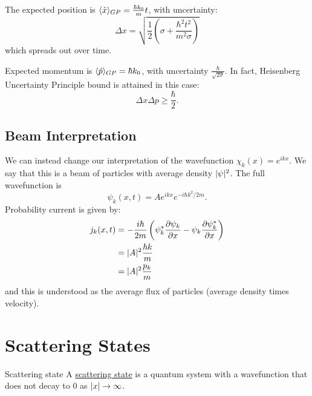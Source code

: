 \documentclass[../Main.tex]{subfiles}
\begin{document}
The expected position is $\langle \hat{x} \rangle_{GP} = \frac{\hbar k_0}{m}t$, with uncertainty: 
\begin{equation*}
    \Delta x = \sqrt{\frac12 \left(\sigma + \frac{\hbar^2 t^2}{m^2 \sigma}\right)}
\end{equation*}
which spreads out over time.

Expected momentum is $\langle \hat{p} \rangle_{GP} = \hbar k_0$, with uncertainty $\frac{\hbar}{\sqrt{2\sigma}}$. In fact, Heisenberg Uncertainty Principle bound is attained in this case:
\begin{equation*}
    \Delta x \Delta p \geq \frac{\hbar}{2}.
\end{equation*}
\subsection{Beam Interpretation}
We can instead change our interpretation of the wavefunction $\chi_k(x) = e^{ikx}$. We say that this is a beam of particles with average density $\lvert\psi\rvert^2$. The full wavefunction is 
\begin{equation*}
    \psi_k(x, t) = Ae^{ikx} e^{-i\hbar k^2 / 2m}.
\end{equation*}
Probability current is given by:
\begin{align*}
    j_k(x, t) &= -\frac{i\hbar}{2m} \left(\psi_k^* \frac{\partial \psi_k}{\partial x} - \psi_k \frac{\partial \psi_k^*}{\partial x}\right) \\
    &= \lvert A\rvert^2 \frac{\hbar k}{m} \\
    &= \lvert A\rvert^2 \frac{p_k}{m}
\end{align*}
and this is understood as the average flux of particles (average density times velocity).
\section{Scattering States}
\begin{definition}{Scattering state}
    A \underline{scattering state} is a quantum system with a wavefunction that does not decay to $0$ as $\lvert x\rvert \to \infty$.
\end{definition}
\end{document}
